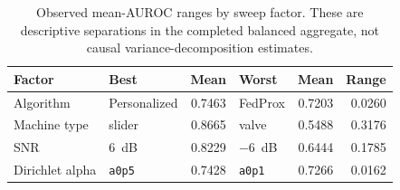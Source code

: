 \begin{table}[t]
\centering
\caption{Observed mean-AUROC ranges by sweep factor. These are descriptive separations in the completed balanced aggregate, not causal variance-decomposition estimates.}
\label{tab:p1-factor-ranges}
\scriptsize
\setlength{\tabcolsep}{2.5pt}
\begin{tabular}{@{}llrlrr@{}}
\toprule
Factor & Best & Mean & Worst & Mean & Range \\
\midrule
Algorithm & Personalized & 0.7463 & FedProx & 0.7203 & 0.0260 \\
Machine type & slider & 0.8665 & valve & 0.5488 & 0.3176 \\
SNR & 6~dB & 0.8229 & $-6$~dB & 0.6444 & 0.1785 \\
Dirichlet alpha & \texttt{a0p5} & 0.7428 & \texttt{a0p1} & 0.7266 & 0.0162 \\
\bottomrule
\end{tabular}
\end{table}
